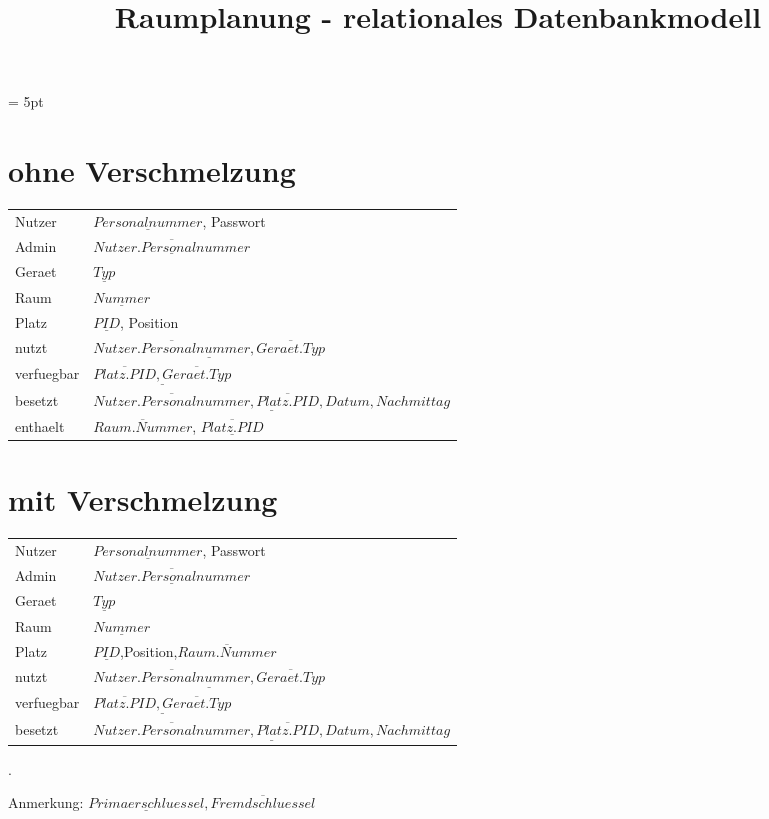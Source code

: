 \documentclass[a4paper,DIV=calc,11pt]{scrartcl}
\begin{document}
\oddsidemargin = 5pt
	
\onehalfspace %
	
\title{Raumplanung - relationales Datenbankmodell}
\maketitle %


\section*{ohne Verschmelzung}
\begin{tabular}{l l}
Nutzer & $\underline{Personalnummer}$, Passwort\\
Admin & $\overline{\underline{Nutzer.Personalnummer}}$\\
Geraet & $\underline{Typ}$\\
Raum & $\underline{Nummer}$\\
Platz & $\underline{PID}$, Position\\
nutzt & $\underline{\overline{Nutzer.Personalnummer}, \overline{Geraet.Typ}}$\\
verfuegbar & $\underline{\overline{Platz.PID}, \overline{Geraet.Typ}}$\\
besetzt & $\underline{\overline{Nutzer.Personalnummer}, \overline{Platz.PID}, Datum, Nachmittag}$\\
enthaelt & $\overline{Raum.Nummer}$, $\underline{\overline{Platz.PID}}$\\
\end{tabular}

\section*{mit Verschmelzung}
\begin{tabular}{l l}
Nutzer & $\underline{Personalnummer}$, Passwort\\
Admin & $\overline{\underline{Nutzer.Personalnummer}}$\\
Geraet & $\underline{Typ}$\\
Raum & $\underline{Nummer}$\\
Platz & $\underline{PID}$,Position,$\overline{Raum.Nummer}$\\
nutzt & $\underline{\overline{Nutzer.Personalnummer}, \overline{Geraet.Typ}}$\\
verfuegbar & $\underline{\overline{Platz.PID}, \overline{Geraet.Typ}}$\\
besetzt & $\underline{\overline{Nutzer.Personalnummer}, \overline{Platz.PID}, Datum, Nachmittag}$\\
\end{tabular}

\begin{spacing}{10}
.\\
\end{spacing}



Anmerkung: $\underline{Primaerschluessel}, \overline{Fremdschluessel}$
\end{document}
